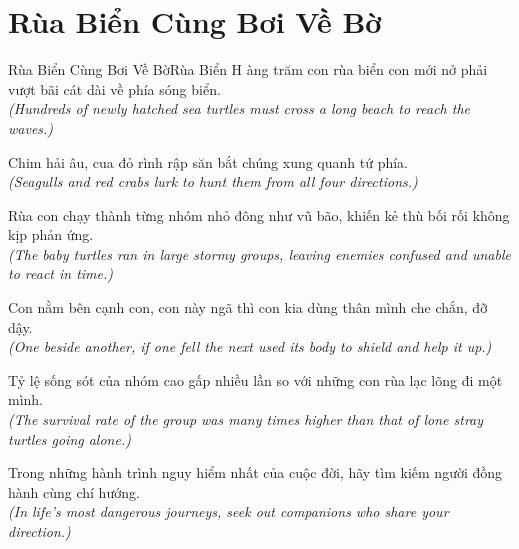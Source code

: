\section{Rùa Biển Cùng Bơi Về Bờ}
\begin{truyen}{Rùa Biển Cùng Bơi Về Bờ}{Rùa Biển}
H àng trăm con rùa biển con mới nở phải vượt bãi cát dài về phía sóng biển.\\
\textit{(Hundreds of newly hatched sea turtles must cross a long beach to reach the waves.)}

Chim hải âu, cua đỏ rình rập săn bắt chúng xung quanh tứ phía.\\
\textit{(Seagulls and red crabs lurk to hunt them from all four directions.)}

Rùa con chạy thành từng nhóm nhỏ đông như vũ bão, khiến kẻ thù bối rối không kịp phản ứng.\\
\textit{(The baby turtles ran in large stormy groups, leaving enemies confused and unable to react in time.)}

Con nằm bên cạnh con, con này ngã thì con kia dùng thân mình che chắn, đỡ dậy.\\
\textit{(One beside another, if one fell the next used its body to shield and help it up.)}

Tỷ lệ sống sót của nhóm cao gấp nhiều lần so với những con rùa lạc lõng đi một mình.\\
\textit{(The survival rate of the group was many times higher than that of lone stray turtles going alone.)}

\end{truyen}
\begin{baihoc}
  Trong những hành trình nguy hiểm nhất của cuộc đời, hãy tìm kiếm người đồng hành cùng chí hướng.\\
  \textit{(In life's most dangerous journeys, seek out companions who share your direction.)}
\end{baihoc}
